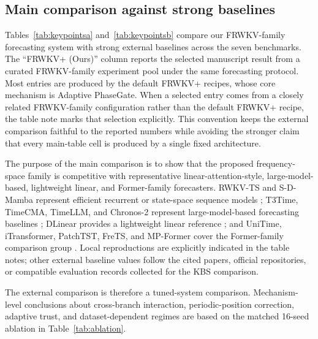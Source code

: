 \documentclass[a4paper,fleqn]{cas-sc}
\begin{document}
\subsection{Main comparison against strong baselines}
Tables~\ref{tab:keypointsa} and~\ref{tab:keypointsb} compare our FRWKV-family forecasting system with strong external baselines across the seven benchmarks. The ``FRWKV+ (Ours)'' column reports the selected manuscript result from a curated FRWKV-family experiment pool under the same forecasting protocol. Most entries are produced by the default FRWKV+ recipes, whose core mechanism is Adaptive PhaseGate. When a selected entry comes from a closely related FRWKV-family configuration rather than the default FRWKV+ recipe, the table note marks that selection explicitly. This convention keeps the external comparison faithful to the reported numbers while avoiding the stronger claim that every main-table cell is produced by a single fixed architecture.

The purpose of the main comparison is to show that the proposed frequency-space family is competitive with representative linear-attention-style, large-model-based, lightweight linear, and Former-family forecasters. RWKV-TS and S-D-Mamba represent efficient recurrent or state-space sequence models \cite{hou2024rwkvts,wang2025smamba}; T3Time, TimeCMA, TimeLLM, and Chronos-2 represent large-model-based forecasting baselines \cite{chowdhury2025t3time,liu2025timecma,jin2024timellm,ansari2025chronos2}; DLinear provides a lightweight linear reference \cite{zeng2023dlinear}; and UniTime, iTransformer, PatchTST, FreTS, and MP-Former cover the Former-family comparison group \cite{liu2024unitime,liu2024itransformer,nie2023patchtst,yi2023frets,naghashi2025multipatchformer}. Local reproductions are explicitly indicated in the table notes; other external baseline values follow the cited papers, official repositories, or compatible evaluation records collected for the KBS comparison.

The external comparison is therefore a tuned-system comparison. Mechanism-level conclusions about cross-branch interaction, periodic-position correction, adaptive trust, and dataset-dependent regimes are based on the matched 16-seed ablation in Table~\ref{tab:ablation}.
\end{document}
